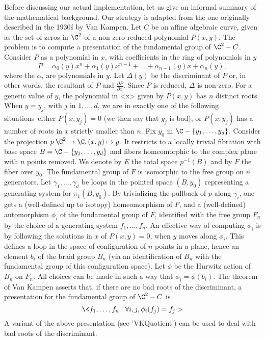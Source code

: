 Before discussing  our actual  implementation, let  us give  an informal
summary of the mathematical background. Our strategy is adapted from the
one originally  described in the  1930\'s by Van  Kampen. Let $C$  be an
affine  algebraic curve,  given as  the  set of  zeros in  $\C^2$ of  a
non-zero  reduced  polynomial $P(x,y)$.  The  problem  is to  compute  a
presentation of the fundamental group of  $\C^2 - C$. Consider $P$ as a
polynomial in $x$, with coefficients in the ring of polynomials in $y$
$$P= \alpha_0(y)x^n +  \alpha_1(y) x^{n-1}  + \dots +  \alpha_{n-1}(y) x
+  \alpha_n(y),$$  where the  $\alpha_i$  are  polynomials in  $y$.  Let
$\Delta(y)$ be the discriminant of $P$ or, in other words, the resultant
of  $P$  and $\frac{\partial  P}{\partial  x}$.  Since $P$  is  reduced,
$\Delta$ is non-zero. For a generic  value of $y$, the polynomial in <x>
given by $P(x,y)$ has $n$ distinct roots.
When $y=y_j$, with $j$ in $1,\dots,d$,
we are in exactly one of
the following situations\:\ either $P(x,y_j)=0$
(we then say that $y_j$ is bad),
or $P(x,y_j)$ has a number of roots in $x$ strictly smaller than
$n$.
Fix $y_0$  in $\C  - \{y_1,\dots,y_d\}$.  Consider the  projection $p\:
\C^2  \rightarrow \C,  (x,y) \mapsto  y$.  It restricts  to a  locally
trivial  fibration with  base  space $B=  \C  - \{y_1,\dots,y_d\}$  and
fibers homeomorphic  to the  complex plane with  $n$ points  removed. We
denote by  $E$ the  total space  $p^{-1}(B)$ and by  $F$ the  fiber over
$y_0$. The fundamental  group of $F$ is isomorphic to  the free group on
$n$ generators.  Let $\gamma_1,\dots,\gamma_d$  be loops in  the pointed
space  $(B,y_0)$ representing  a generating  system for  $\pi_1(B,y_0)$.
By  trivializing  the pullback  of  $p$  along  $\gamma_i$, one  gets  a
(well-defined up to isotopy) homeomorphism  of $F$, and a (well-defined)
automorphism  $\phi_i$  of  the  fundamental group  of  $F$,  identified
with  the  free  group  $F_n$  by the  choice  of  a  generating  system
$f_1,\dots,f_n$. An effective way of  computing $\phi_i$ is by following
the solutions in $x$ of $P(x,y)=0$,  when $y$ moves along $\phi_i$. This
defines a loop in  the space of configuration of $n$  points in a plane,
hence an element  $b_i$ of the braid group $B_n$  (via an identification
of $B_n$  with the fundamental  group of this configuration  space). Let
$\phi$ be the Hurwitz action of $B_n$  on $F_n$. All choices can be made
in such a way that $\phi_i=\phi(b_i)$. The theorem of Van Kampen asserts
that, if there are no bad  roots of the discriminant, a presentation for
the fundamental group of $\C^2 -  C$ is $$\< f_1,\dots,f_n \mid \forall
i,j,  \phi_i(f_j)=f_j >  $$ A  variant  of the  above presentation  (see
'VKQuotient') can be used to deal with bad roots of the discriminant.

